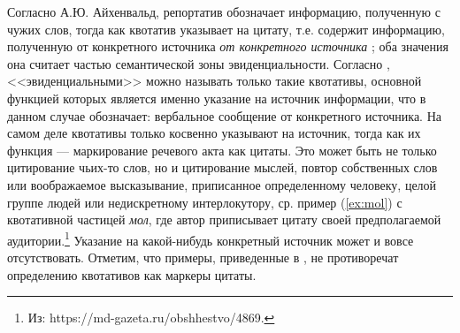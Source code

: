 \par Согласно А.Ю. Айхенвальд, репортатив обозначает информацию, полученную с чужих слов, тогда как квотатив указывает на цитату, т.е. содержит информацию, полученную от конкретного источника \textit{от конкретного источника} \citep[25]{aikhenvald2004}; оба значения она считает частью семантической зоны эвиденциальности. \color{black} Согласно \citep{holvoet2018}, <<эвиденциальными>> можно называть только такие квотативы, основной функцией которых является именно указание на источник информации, что в данном случае обозначает: вербальное сообщение от конкретного источника.
На самом деле квотативы только косвенно указывают на источник, тогда как их функция --- маркирование речевого акта как цитаты. Это может быть не только цитирование чьих-то слов, но и цитирование мыслей, повтор собственных слов или воображаемое высказывание, приписанное определенному человеку, целой группе людей или недискретному интерлокутору, ср. пример (\ref{ex:mol}) с квотативной частицей \textit{мол}, где автор приписывает цитату своей предполагаемой аудитории.\footnote{Из: https://md-gazeta.ru/obshhestvo/4869.} Указание на какой-нибудь конкретный источник может и вовсе отсутствовать. Отметим, что примеры, приведенные в \citep{aikhenvald2004}, не противоречат определению квотативов как маркеры цитаты.



